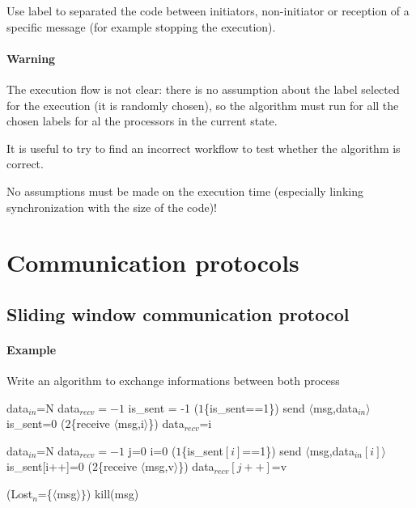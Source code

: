 \documentclass{article}
\begin{document}
Use label to separated the code between initiators, non-initiator or reception of a specific message (for example stopping the execution).

\paragraph{Warning}
The execution flow is not clear: there is no assumption about the label selected for the execution (it is randomly chosen), so the algorithm must run for all the chosen labels for al the processors in the current state.

It is useful to try to find an incorrect workflow to test whether the algorithm is correct.

No assumptions must be made on the execution time (especially linking synchronization with the size of the code)!


\section{Communication protocols}
\subsection{Sliding window communication protocol}
\paragraph{Example} Write an algorithm to exchange informations between both process

\begin{algorithm}[h]
\Var
data$_{in}$=N\;
data$_{recv}=-1$\;
is\_sent = -1\;
\Label ($1$\{is\_sent==1\}){
send $\langle$msg,data$_{in}\rangle$
is\_sent=0\;
}
\Label ($2$\{receive $\langle$msg,i$\rangle$\}){
data$_{recv}$=i\;
}
\end{algorithm}

\begin{algorithm}
\Var
data$_{in}$=N\;
data$_{recv}=-1$\;
j=0\;
i=0\;
\Label ($1$\{is\_sent$[i]$==1\}){
send $\langle$msg,data$_{in}[i]\rangle$\;
is\_sent[i++]=0\;
}
\Label (${2}$\{receive $\langle$msg,v$\rangle$\}){
data$_{recv}[j++]$=v\;
}
\end{algorithm}

\begin{algorithm}
\Label (Lost$_n$=\{$\langle$msg$\rangle\}$){
kill(msg)\\
}
\end{algorithm}
\end{document}
